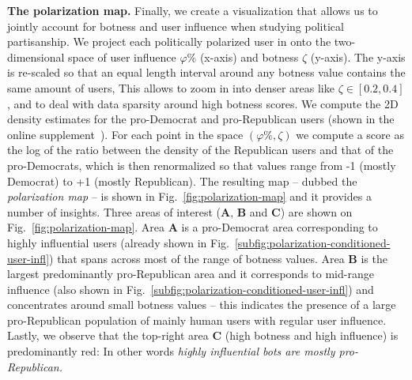 \textbf{The polarization map.}
Finally, we create a visualization that allows us to jointly account for botness and user influence when studying political partisanship.
We project each politically polarized user in \debate onto the two-dimensional space of user influence $\varphi \%$ (x-axis) and botness $\zeta$ (y-axis).
The y-axis is re-scaled so that an equal length interval around any botness value contains the same amount of users,
This allows to zoom in into denser areas like $\zeta \in [0.2, 0.4]$, and to deal with data sparsity around high botness scores.
We compute the 2D density estimates for the pro-Democrat and pro-Republican users (shown in the online supplement~\cite[annex~E]{supplemental}).
For each point in the space $(\varphi \%, \zeta)$ we compute a score as the log of the ratio between the density of the Republican users and that of the pro-Democrats, which is then renormalized so that values range from -1 (mostly Democrat) to +1 (mostly Republican).
The resulting map -- dubbed the \emph{polarization map} -- is shown in Fig.~\ref{fig:polarization-map} and it provides a number of insights.
Three areas of interest (\textbf{A}, \textbf{B} and \textbf{C}) are shown on Fig.~\ref{fig:polarization-map}.
Area \textbf{A} is a pro-Democrat area corresponding to highly influential users (already shown in Fig.~\ref{subfig:polarization-conditioned-user-infl}) that spans across most of the range of botness values.
Area \textbf{B} is the largest predominantly pro-Republican area and it corresponds to mid-range influence (also shown in Fig.~\ref{subfig:polarization-conditioned-user-infl}) and concentrates around small botness values -- this indicates the presence of a large pro-Republican population of mainly human users with regular user influence.
Lastly, we observe that the top-right area \textbf{C} (high botness and high influence) is predominantly red: 
In other words \emph{highly influential bots are mostly pro-Republican.}